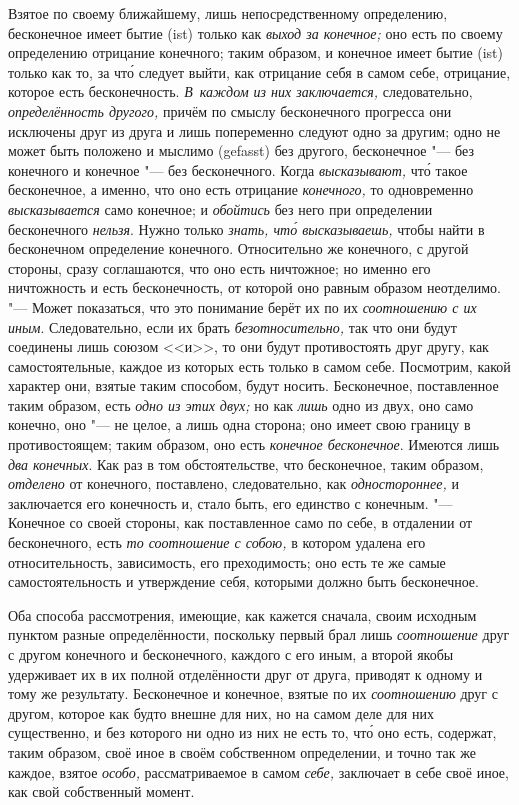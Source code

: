 Взятое по своему ближайшему, лишь непосредственному определению, бесконечное
имеет бытие (ist) только как {\em выход за конечное;}
оно есть по своему определению отрицание конечного; таким образом, и
конечное имеет бытие (ist) только как то, за чт\'{о} следует выйти, как
отрицание себя в самом себе, отрицание, которое есть бесконечность.
{\em В~каждом из них заключается,} следовательно,
{\em определённость другого,} причём по смыслу
бесконечного прогресса они исключены друг из друга и лишь попеременно
следуют одно за другим; одно не может быть положено и мыслимо (gefasst) без
другого, бесконечное "--- без конечного и конечное "--- без бесконечного. Когда
{\em высказывают,} чт\'{о} такое бесконечное, а именно, что
оно есть отрицание {\em конечного,} то одновременно
{\em высказывается} само конечное; и
{\em обойтись} без него при определении бесконечного
{\em нельзя}. Нужно только
{\em знать, чт\'{о} высказываешь,} чтобы найти в
бесконечном определение конечного. Относительно же конечного, с другой
стороны, сразу соглашаются, что оно есть ничтожное; но именно его
ничтожность и есть бесконечность, от которой оно равным образом неотделимо.
"--- Может показаться, что это понимание берёт их по их
{\em соотношению с их иным}. Следовательно, если их
брать {\em безотносительно,} так что они будут
соединены лишь союзом <<и>>, то они будут противостоять друг другу, как
самостоятельные, каждое из которых есть только в самом себе. Посмотрим,
какой характер они, взятые таким способом, будут носить. Бесконечное,
поставленное таким образом, есть {\em одно из этих
двух;} но как {\em лишь} одно из двух, оно само
конечно, оно "--- не целое, а лишь одна сторона; оно имеет свою границу в
противостоящем; таким образом, оно есть {\em конечное
бесконечное}. Имеются лишь {\em два конечных}. Как раз
в том обстоятельстве, что бесконечное, таким образом,
{\em отделено} от конечного, поставлено, следовательно,
как {\em одностороннее,} и заключается его конечность
и, стало быть, его единство с конечным. "--- Конечное со своей стороны, как
поставленное само по себе, в отдалении от бесконечного, есть
{\em то соотношение с собою,} в котором удалена его
относительность, зависимость, его преходимость; оно есть те же самые
самостоятельность и утверждение себя, которыми должно быть бесконечное.

Оба способа рассмотрения, имеющие, как кажется сначала, своим исходным
пунктом разные определённости, поскольку первый брал лишь
{\em соотношение} друг с другом конечного и
бесконечного, каждого с его иным, а второй якобы удерживает их в их
полной отделённости друг от друга, приводят к одному и тому же результату.
Бесконечное и конечное, взятые по их {\em соотношению}
друг с другом, которое как будто внешне для них, но на самом деле для них
существенно, и без которого ни одно из них не есть то, чт\'{о} оно есть,
содержат, таким образом, своё иное в своём собственном определении, и
точно так же каждое, взятое {\em особо,}
рассматриваемое в самом {\em себе,} заключает в себе
своё иное, как свой собственный момент.

